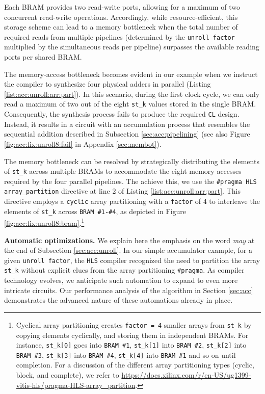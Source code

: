 \documentclass[12pt,american]{article}
\begin{document}
Each BRAM provides two read-write ports, allowing for a maximum of two concurrent read-write operations.
Accordingly, while resource-efficient, this storage scheme can lead to a memory bottleneck when the total number of required reads from multiple pipelines (determined by the \texttt{unroll factor} multiplied by the simultaneous reads per pipeline) surpasses the available reading ports per shared BRAM.

The memory-access bottleneck becomes evident in our example when we instruct the compiler to synthesize four physical adders in parallel (Listing \ref{list:acc:unroll:arr:part}). In this scenario, during the first clock cycle, we can only read a maximum of two out of the eight \texttt{st\_k} values stored in the single BRAM. Consequently, the synthesis process fails to produce the required \texttt{CL} design. Instead, it results in a circuit with an accumulation process that resembles the sequential addition described in Subsection \ref{sec:acc:pipelining} (see also Figure \ref{fig:acc:fix:unroll8:fail} in Appendix \ref{sec:membot}).

The memory bottleneck can be resolved by strategically distributing the elements of \texttt{st\_k} across multiple BRAMs to accommodate the eight memory accesses required by the four parallel pipelines.
The achieve this, we use the \texttt{\#pragma HLS array\_partition} directive at line 2 of Listing \ref{list:acc:unroll:arr:part}. This directive employs a \texttt{cyclic} array partitioning with a 
\texttt{factor} of 4 to interleave the elements of \texttt{st\_k} across \texttt{BRAM \#1-\#4}, as depicted in Figure \ref{fig:acc:fix:unroll8:bram}.\footnote{Cyclical array partitioning creates \texttt{factor = 4} smaller arrays from \texttt{st\_k} by copying elements cyclically, and storing them in independent BRAMs. For instance, \texttt{st\_k[0]} goes into \texttt{BRAM \#1}, \texttt{st\_k[1]} into \texttt{BRAM \#2}, \texttt{st\_k[2]} into \texttt{BRAM \#3}, \texttt{st\_k[3]} into \texttt{BRAM \#4}, \texttt{st\_k[4]} into \texttt{BRAM \#1} and so on until completion. For a discussion of the different array partitioning types (cyclic, block, and complete), we refer to \url{https://docs.xilinx.com/r/en-US/ug1399-vitis-hls/pragma-HLS-array_partition}.}

\noindent\textbf{Automatic optimizations.} We explain here the emphasis on the word \textit{may} at the end of Subsection \ref{sec:acc:unroll}. In our simple accumulator example, for a given \texttt{unroll factor}, the \texttt{HLS} compiler recognized the need to partition the array \texttt{st\_k} without explicit clues from the array partitioning \texttt{\#pragma}. As compiler technology evolves, we anticipate such automation to expand to even more intricate circuits. Our performance analysis of the \citet{KrusellSmith1998} algorithm in Section \ref{sec:acc} demonstrates the advanced nature of these automations already in place.
\end{document}
